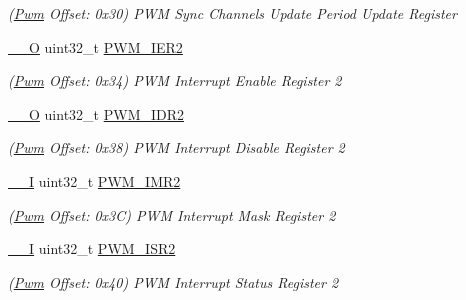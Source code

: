 \begin{DoxyCompactItemize}
\begin{DoxyCompactList}\small\item\em (\mbox{\hyperlink{structPwm}{Pwm}} Offset\+: 0x30) P\+WM Sync Channels Update Period Update Register \end{DoxyCompactList}\item 
\mbox{\label{structPwm_aa42f42c91e02a16ceae07e1ffd29b006}} 
\mbox{\hyperlink{core__cm7_8h_a7e25d9380f9ef903923964322e71f2f6}{\+\_\+\+\_\+O}} uint32\+\_\+t \mbox{\hyperlink{structPwm_aa42f42c91e02a16ceae07e1ffd29b006}{P\+W\+M\+\_\+\+I\+E\+R2}}
\begin{DoxyCompactList}\small\item\em (\mbox{\hyperlink{structPwm}{Pwm}} Offset\+: 0x34) P\+WM Interrupt Enable Register 2 \end{DoxyCompactList}\item 
\mbox{\label{structPwm_a64e5d011d5618d2a047b9e70dafe8a2a}} 
\mbox{\hyperlink{core__cm7_8h_a7e25d9380f9ef903923964322e71f2f6}{\+\_\+\+\_\+O}} uint32\+\_\+t \mbox{\hyperlink{structPwm_a64e5d011d5618d2a047b9e70dafe8a2a}{P\+W\+M\+\_\+\+I\+D\+R2}}
\begin{DoxyCompactList}\small\item\em (\mbox{\hyperlink{structPwm}{Pwm}} Offset\+: 0x38) P\+WM Interrupt Disable Register 2 \end{DoxyCompactList}\item 
\mbox{\label{structPwm_a385a537ddc9c6c395d83d95c1a06ef19}} 
\mbox{\hyperlink{core__cm7_8h_af63697ed9952cc71e1225efe205f6cd3}{\+\_\+\+\_\+I}} uint32\+\_\+t \mbox{\hyperlink{structPwm_a385a537ddc9c6c395d83d95c1a06ef19}{P\+W\+M\+\_\+\+I\+M\+R2}}
\begin{DoxyCompactList}\small\item\em (\mbox{\hyperlink{structPwm}{Pwm}} Offset\+: 0x3C) P\+WM Interrupt Mask Register 2 \end{DoxyCompactList}\item 
\mbox{\label{structPwm_a815d3fa2563b0e4d6e9d0da560689263}} 
\mbox{\hyperlink{core__cm7_8h_af63697ed9952cc71e1225efe205f6cd3}{\+\_\+\+\_\+I}} uint32\+\_\+t \mbox{\hyperlink{structPwm_a815d3fa2563b0e4d6e9d0da560689263}{P\+W\+M\+\_\+\+I\+S\+R2}}
\begin{DoxyCompactList}\small\item\em (\mbox{\hyperlink{structPwm}{Pwm}} Offset\+: 0x40) P\+WM Interrupt Status Register 2 \end{DoxyCompactList}\item 

\end{DoxyCompactItemize}
